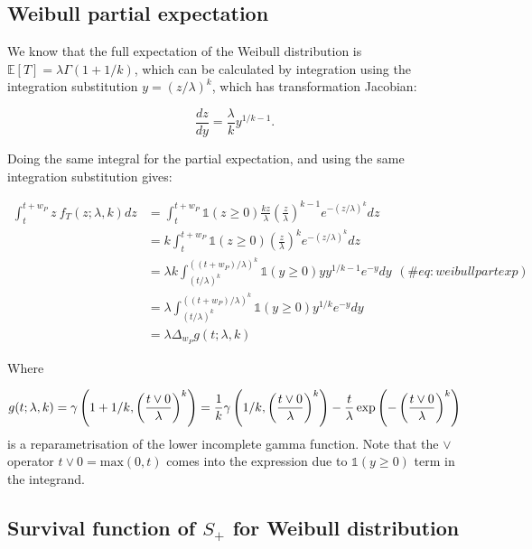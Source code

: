 \documentclass[10pt,letterpaper]{article}
\begin{document}
\subsection{Weibull partial expectation}

We know that the full expectation of the Weibull distribution is $\mathbb{E}[T] = \lambda \Gamma(1 + 1/k)$, which can be calculated by integration using the integration substitution $y = (z / \lambda)^k$, which has transformation Jacobian:

\begin{equation}
\frac{dz}{dy} = \frac{\lambda}{k}y^{1/k - 1}.
\end{equation}

Doing the same integral for the partial expectation, and using the same integration substitution gives:

\begin{equation}
\begin{aligned}
\int_{t}^{t+w_P} z~ f_T(z; \lambda,k) dz  &= \int_t^{t+w_P} \mathbb{1}(z \geq 0) \frac{kz}{\lambda}\left(\frac{z}{\lambda}\right)^{k-1}e^{-(z/\lambda)^{k}} dz \\
&= k\int_t^{t+w_P} \mathbb{1}(z \geq 0) \left(\frac{z}{\lambda}\right)^{k}e^{-(z/\lambda)^{k}} dz  \\
&= \lambda k \int_{(t / \lambda)^k}^{((t + w_P) / \lambda)^k} \mathbb{1}(y \geq 0) y y^{1/k - 1} e^{-y} dy  \\
&= \lambda\int_{(t / \lambda)^k}^{((t + w_P) / \lambda)^k} \mathbb{1}(y \geq 0)  y^{1/k} e^{-y} dy\\
&= \lambda \Delta_{w_P} g(t; \lambda,k)
\end{aligned} (\#eq:weibullpartexp)
\end{equation}

Where

\begin{equation}
g(t; \lambda, k) =  \gamma\left(1 + 1/k, \left({t\vee 0 \over \lambda}\right)^k\right) =  \frac{1}{k}\gamma\left(1/k, \left({t\vee 0 \over \lambda}\right)^k\right) - \frac{t}{\lambda}\exp\left(-\left({t\vee 0 \over \lambda}\right)^k\right)
\end{equation}
is a reparametrisation of the lower incomplete gamma function. Note that the $\vee$ operator $t \vee 0 = \text{max}(0, t)$ comes into the expression due to $\mathbb{1}(y \geq 0)$ term in the integrand.

\subsection{Survival function of $S_{+}$ for Weibull distribution}
\end{document}
